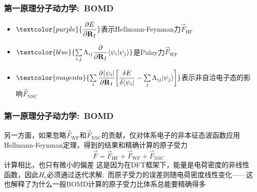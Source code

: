 {\frame
{
	\frametitle{第一原理分子动力学:~\textrm{BOMD}}
	\begin{itemize}
		\item $\textcolor{purple}{\dfrac{\partial E}{\partial\mathbf{R}_I}}$表示\textrm{Hellmann-Feynman}力$\vec F_{\mathrm{HF}}$
		\item $\textcolor{blue}{\sum\limits_{i,j}\Lambda_{ij}\dfrac{\partial}{\partial \mathbf{R}_I}\langle\psi_i|\psi_j\rangle}$是\textrm{Pulay}力$\vec F_{\mathrm{WF}}$\\
			{\fontsize{6.2pt}{4.2pt}}
		\item $\textcolor{magenta}{\sum\limits_i\dfrac{\partial\langle\psi_i|}{\partial\mathbf{R}_I}\bigg[\dfrac{\delta E}{\delta\langle\psi_i|}-\sum\limits_j\Lambda_{ij}|\psi_j\rangle\bigg]}$表示非自洽电子态的影响$\vec F_{\mathrm{NSC}}$\\
			{\fontsize{6.2pt}{4.2pt}}
	\end{itemize}
}

\frame
{
	\frametitle{第一原理分子动力学:~\textrm{BOMD}}
	另一方面，如果忽略$\vec F_{\mathrm{WF}}$和$\vec F_{\mathrm{NSC}}$的贡献，仅对体系电子的非本征态波函数应用\textrm{Hellmann-Feynman}定理，得到的结果和精确计算的原子受力
	\begin{displaymath}
		\vec F=\vec F_{\mathrm{HF}}+\vec F_{\mathrm{WF}}+\vec F_{\mathrm{NSC}}
	\end{displaymath}
	计算相比，也只有微小的偏差
	\vskip 1.5pt
	这是因为在\textrm{DFT}框架下，能量是电荷密度的非线性函数，因此$H_{\mathrm{e}}$必须通过迭代求解;~而原子受力的误差则随电荷密度线性变化——这也解释了为什么一般\textrm{BOMD}计算的原子受力比体系总能要精确得多

}}
